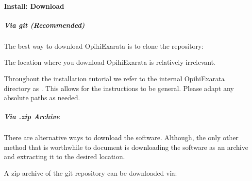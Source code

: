 \documentclass[letterpaper,11pt,english]{sphinxmanual}
\begin{document}
\sphinxstepscope


\paragraph{Install: Download}
\label{\detokenize{technical/installation/download:install-download}}\label{\detokenize{technical/installation/download:technical-installation-download}}\label{\detokenize{technical/installation/download::doc}}

\subparagraph{Via git (Recommended)}
\label{\detokenize{technical/installation/download:via-git-recommended}}
\sphinxAtStartPar
The best way to download OpihiExarata is to clone the repository:

\begin{sphinxVerbatim}[commandchars=\\\{\}]
  
\end{sphinxVerbatim}

\sphinxAtStartPar
The location where you download OpihiExarata is relatively irrelevant.

\sphinxAtStartPar
Throughout the installation tutorial we refer to the internal OpihiExarata
directory as . This allows for the instructions to be
general. Please adapt any absolute paths as needed.


\subparagraph{Via .zip Archive}
\label{\detokenize{technical/installation/download:via-zip-archive}}
\sphinxAtStartPar
There are alternative ways to download the software. Although, the only other
method that is worthwhile to document is downloading the software as an
archive and extracting it to the desired location.

\sphinxAtStartPar
A zip archive of the git repository can be downloaded via:

\begin{sphinxVerbatim}[commandchars=\\\{\}]
   
 
  
 
\end{sphinxVerbatim}
\end{document}

